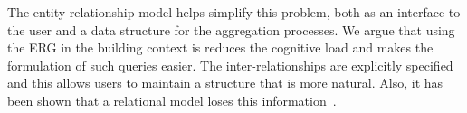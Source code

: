 The entity-relationship model helps simplify this problem, both as an interface to the user and a data structure for the aggregation processes.  
We argue that using the ERG in the building context is reduces the cognitive load and makes the formulation
of such queries easier.  The inter-relationships are explicitly specified and this allows users to 
maintain a structure that is more natural.  Also, it has been shown  that a relational model loses this 
information~\cite{SenkoDB}.







